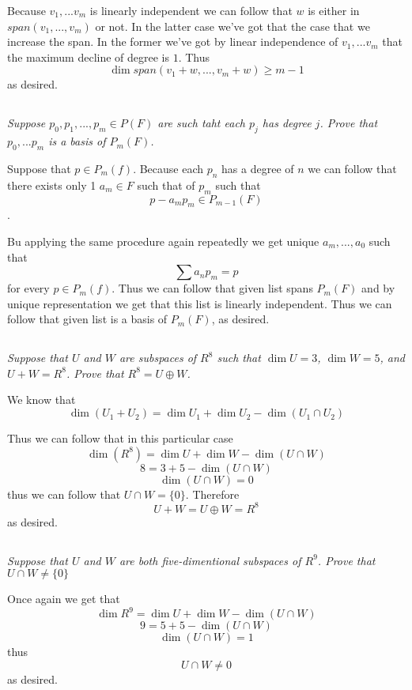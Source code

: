 \documentclass[11pt,oneside,titlepage]{book}
\begin{document}
Because $v_1, ... v_m$ is linearly independent we can follow that $w$ is either
in $span(v_1, ..., v_m)$ or not. In the latter case we've got that the
case that we increase the span. In the former we've got by linear independence
of $v_1, ... v_m$ that the maximum decline of degree is $1$. Thus
$$\dim span(v_1 + w, ..., v_m + w) \geq m - 1$$
as desired.

\subsection{}

\textit{Suppose $p_0, p_1, ..., p_m \in P(F)$ are such taht each $p_j$ has
  degree $j$. Prove that $p_0, ... p_m$ is a basis of $P_m(F)$. }

Suppose that $p \in P_m(f)$. Because each $p_n$ has a degree of $n$ we can
follow that there exists only 1 $a_m \in F$ such that 
of $p_m$ such that
$$p - a_m p_m \in P_{m - 1}(F)$$.

Bu applying the same procedure  again repeatedly  we get unique
$a_m, ..., a_0$ such that
$$\sum{a_n p_m} = p$$
for every $p \in P_m(f)$. Thus we can follow that given list spans $P_m(F)$
and by unique representation we get that this list is linearly independent.
Thus we can follow that given list is a basis of $P_m(F)$, as desired.


\subsection{}
\textit{Suppose that $U$ and $W$ are subspaces of $R^8$ such that $\dim U = 3$,
  $\dim W = 5$, and $U + W = R^8$. Prove that $R^8 = U \oplus W$.}

We know that
$$\dim (U_1 + U_2) = \dim U_1 + \dim U_2 - \dim (U_1 \cap U_2)$$

Thus we can follow that in this particular case
$$\dim (R^8) = \dim U + \dim W - \dim (U \cap W)$$
$$8 = 3 + 5 - \dim (U \cap W)$$
$$\dim (U \cap W) = 0$$
thus we can follow that $U \cap W = \{0\}$. Therefore
$$U + W = U \oplus W = R^8$$
as desired.

\subsection{}
\textit{Suppose that $U$ and $W$ are both five-dimentional subspaces of $R^9$.
  Prove that $U \cap W \neq \{0\}$}

Once again we get that
$$\dim R^9 = \dim U + \dim W - \dim (U \cap W)$$
$$9 = 5 + 5- \dim (U \cap W)$$
$$\dim (U \cap W) = 1$$
thus
$$U \cap W \neq 0$$
as desired.
\end{document}
